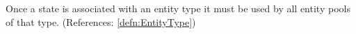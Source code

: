 Once a state is
associated with an entity type it must be used by all entity pools of
that type.
(References: \ref{defn:EntityType})